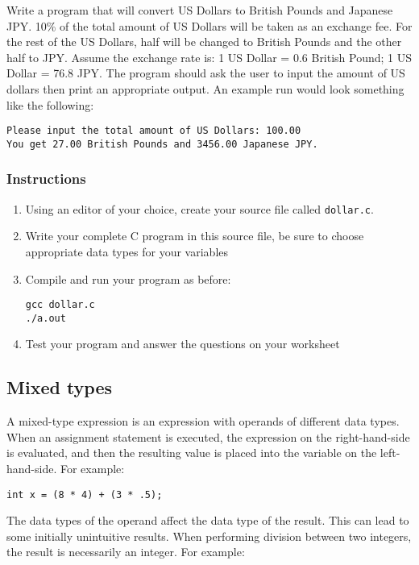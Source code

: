 \documentclass[12pt]{scrartcl}
\begin{document}
Write a program that will convert US Dollars to British Pounds and
Japanese JPY.  10\% of the total amount of US Dollars will be taken
as an exchange fee.  For the rest of the US Dollars, half will be
changed to British Pounds and the other half to JPY.  Assume the
exchange rate is: 1 US Dollar = 0.6 British Pound; 1 US Dollar =
76.8 JPY.  The program should ask the user to input the amount
of US dollars then print an appropriate output.  An example run
would look something like the following:

\begin{verbatim}
Please input the total amount of US Dollars: 100.00
You get 27.00 British Pounds and 3456.00 Japanese JPY.
\end{verbatim}

\subsubsection*{Instructions}

\begin{enumerate}
  \item Using an editor of your choice, create your source file
	called \texttt{dollar.c}.
  \item Write your complete C program in this source file, be sure
  	to choose appropriate data types for your variables
  \item Compile and run your program as before:

\begin{verbatim}
gcc dollar.c
./a.out
\end{verbatim}
  \item Test your program and answer the questions on your worksheet
\end{enumerate}

\subsection{Mixed types}

A mixed-type expression is an expression with operands of different
data types. When an assignment statement is executed, the expression
on the right-hand-side is evaluated, and then the resulting value is
placed into the variable on the left-hand-side.  For example:

\begin{verbatim}
int x = (8 * 4) + (3 * .5);
\end{verbatim}

The data types of the operand affect the data type of the result.  This
can lead to some initially unintuitive results.  When performing division
between two integers, the result is necessarily an integer.  For example:
\end{document}
